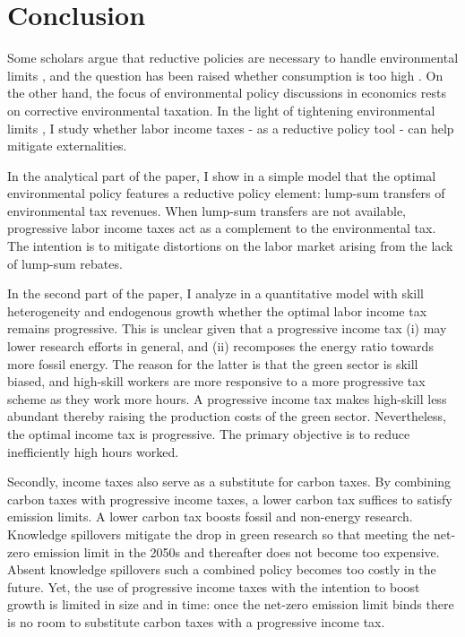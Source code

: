 \section{Conclusion}\label{sec:con}
Some scholars argue that  reductive policies are necessary to handle environmental limits \citep{Schor2005SustainableReductionb, VanVuuren2018AlternativeTechnologies, Bertram2018TargetedScenarios}, and the question has been raised whether consumption is too high \citep{Arrow2004AreMuch}. On the other hand, the focus of environmental policy discussions in economics rests on corrective environmental taxation. In the light of tightening environmental limits \citep{Rockstrom2009AHumanity, IPCC2022}, I study whether labor income taxes - as a reductive policy tool - can help mitigate externalities. 

In the analytical part of the paper, I show in a simple model that the optimal environmental policy features a reductive policy element: lump-sum transfers of environmental tax revenues. When lump-sum transfers are not available, progressive labor income taxes act as a complement to the environmental tax. The intention is to mitigate distortions on the labor market arising from the lack of lump-sum rebates. %


In the second part of the paper, I analyze in a quantitative model with skill heterogeneity and endogenous growth whether the optimal labor income tax remains progressive.
This is unclear given that a progressive income tax (i) may lower research efforts in general, and (ii) recomposes the energy ratio towards more fossil energy. The reason for the latter is that the green sector is skill biased, and high-skill workers are more responsive to a more progressive tax scheme as they work more hours. 
A progressive income tax makes high-skill less abundant thereby raising the production costs of the green sector. 
Nevertheless, the optimal income tax is progressive. The primary objective is to reduce inefficiently high hours worked. 

Secondly, income taxes also serve as a substitute for carbon taxes.
By combining carbon taxes with progressive income taxes, a lower carbon tax suffices to satisfy emission limits. A lower carbon tax boosts fossil and non-energy research. Knowledge spillovers mitigate the drop in green research so that meeting the net-zero emission limit in the 2050s and thereafter does not become too expensive. Absent knowledge spillovers such a combined policy becomes too costly in the future. Yet, the use of progressive income taxes with the intention to boost growth is limited in size and in time: once the net-zero emission limit binds there is no room to substitute carbon taxes with a progressive income tax.

